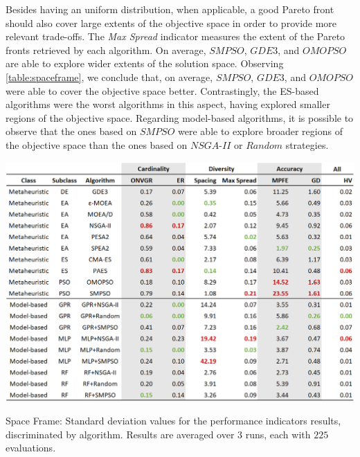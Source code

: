 Besides having an uniform distribution, when applicable, a good Pareto front should also cover large extents of the objective space in order to provide more relevant trade-offs. The \textit{Max Spread} indicator measures the extent of the Pareto fronts retrieved by each algorithm. On average, $SMPSO$, $GDE3$, and $OMOPSO$ are able to explore wider extents of the solution space. Observing \cref{table:spaceframe}, we conclude that, on average, $SMPSO$, $GDE3$, and $OMOPSO$ were able to cover the objective space better. Contrastingly, the \ac{ES}-based algorithms were the worst algorithms in this aspect, having explored smaller regions of the objective space. Regarding model-based algorithms, it is possible to observe that the ones based on $SMPSO$ were able to explore broader regions of the objective space than the ones based on $NSGA$-$II$ or $Random$ strategies. 

\begin{table}[]
	\centering
	\includegraphics[width=\textwidth]{Images/Evaluation/caadria/Results_Std_20190428.PNG}
	\caption[Space Frame: Standard deviation values for the performance indicators results, discriminated by each algorithm]{Space Frame: Standard deviation values for the performance indicators results, discriminated by algorithm. Results are averaged over $3$ runs, each with $225$ evaluations.}
	\label{table:spaceframestd}
\end{table}

